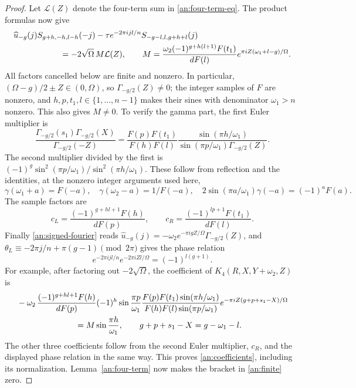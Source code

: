 \documentclass[11pt]{article}
\numberwithin{equation}{section}
\theoremstyle{definition}
\theoremstyle{remark}
\begin{document}
\begin{proof}
Let $\mathcal L(Z)$ denote the four-term sum in
\eqref{an:four-term-eq}.  The product formulas now give
\begin{equation}
\begin{split}
 &\widehat u_{-g}(j)S_{g+h,-h,l-h}(-j)
       -\tau e^{-2\pi ijl/n}S_{-g-l,l,g+h+l}(j)\\
 &\hspace{20mm}=-2\sqrt\Omega\,M\mathcal L(Z),\qquad
 M=\frac{\omega_2(-1)^{g+h(l+1)}F(t_1)}{dF(l)}
                          e^{\pi iZ(\omega_1+l-g)/\Omega}.
\end{split}
 \label{an:coefficients}
\end{equation}
All factors cancelled below are finite and nonzero.  In particular,
$(\Omega-g)/2\pm Z\in(0,\Omega)$, so
$\Gamma_{-g/2}(Z)\ne0$; the integer samples of $F$ are nonzero, and
$h,p,t_1,l\in\{1,\ldots,n-1\}$ makes their sines with denominator
$\omega_1>n$ nonzero.  This also gives $M\ne0$.
To verify the gamma part, the first Euler multiplier is
\[
 \frac{\Gamma_{-g/2}(s_1)\Gamma_{-g/2}(X)}{\Gamma_{-g/2}(-Z)}
 =\frac{F(p)F(t_1)}{F(h)F(l)}
       \frac{\sin(\pi h/\omega_1)}{\sin(\pi p/\omega_1)\Gamma_{-g/2}(Z)}.
\]
The second multiplier divided by the first is
$(-1)^g\sin^2(\pi p/\omega_1)/\sin^2(\pi h/\omega_1)$.
These follow from reflection and the identities, at the nonzero
integer arguments used here,
\[
 \gamma(\omega_1+a)=F(-a),\quad \gamma(\omega_2-a)=1/F(-a),\quad
 2\sin(\pi a/\omega_1)\gamma(-a)=(-1)^aF(a).
\]
The sample factors are
\[
 c_L=\frac{(-1)^{g+hl+1}F(h)}{dF(p)},\qquad
 c_R=\frac{(-1)^{lp+1}F(t_1)}{dF(l)}.
\]
Finally \eqref{an:signed-fourier} reads
$\widehat u_{-g}(j)=-\omega_2 e^{-\pi igZ/\Omega}\Gamma_{-g/2}(Z)$, and
$\theta_L\equiv-2\pi j/n+\pi(g-1)\pmod{2\pi}$
gives the phase relation
\[
 e^{-2\pi ijl/n}e^{-2\pi iZl/\Omega}=(-1)^{l(g+1)}.
\]
For example, after factoring out $-2\sqrt\Omega$, the coefficient of
$K_4(R,X,Y+\omega_2,Z)$ is
\begin{align*}
 &-\omega_2\,
 \frac{(-1)^{g+hl+1}F(h)}{dF(p)}
 (-1)^h\sin\frac{\pi p}{\omega_1}
 \frac{F(p)F(t_1)\sin(\pi h/\omega_1)}
      {F(h)F(l)\sin(\pi p/\omega_1)}
 e^{-\pi iZ(g+p+s_1-X)/\Omega}\\
 &\hspace{25mm}=M\sin\frac{\pi h}{\omega_1},
 \qquad g+p+s_1-X=g-\omega_1-l.
\end{align*}
The other three coefficients follow from the second Euler multiplier,
$c_R$, and the displayed phase relation in the same way.  This proves
\eqref{an:coefficients}, including its normalization.
Lemma~\ref{an:four-term} now makes the bracket in
\eqref{an:finite} zero.
\end{proof}
\end{document}
